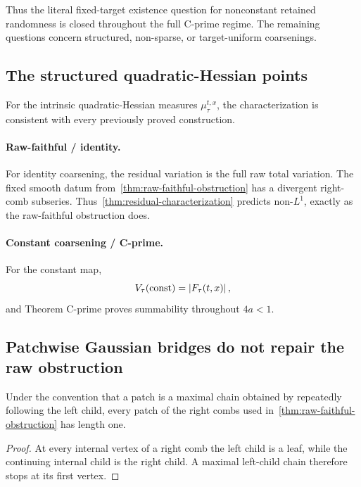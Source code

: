 Thus the literal fixed-target existence question for nonconstant retained randomness is closed throughout the full C-prime regime. The remaining questions concern structured, non-sparse, or target-uniform coarsenings.

\subsection{The structured quadratic-Hessian points}

For the intrinsic quadratic-Hessian measures $\mu_\tau^{t,x}$, the characterization is consistent with every previously proved construction.

\paragraph{Raw-faithful / identity.}
For identity coarsening, the residual variation is the full raw total variation. The fixed smooth datum from~\cref{thm:raw-faithful-obstruction} has a divergent right-comb subseries. Thus~\cref{thm:residual-characterization} predicts non-$L^1$, exactly as the raw-faithful obstruction does.

\paragraph{Constant coarsening / C-prime.}
For the constant map,
\begin{equation*}
  V_\tau(\mathrm{const})
  =
  \left|F_\tau(t,x)\right|,
\end{equation*}
and Theorem C-prime proves summability throughout $4a<1$.

\subsection{Patchwise Gaussian bridges do not repair the raw obstruction}

\begin{lemma}
\label{lem:right-comb-one-edge}
Under the convention that a patch is a maximal chain obtained by repeatedly following the left child, every patch of the right combs used in~\cref{thm:raw-faithful-obstruction} has length one.
\end{lemma}

\begin{proof}
At every internal vertex of a right comb the left child is a leaf, while the continuing internal child is the right child. A maximal left-child chain therefore stops at its first vertex.
\end{proof}

